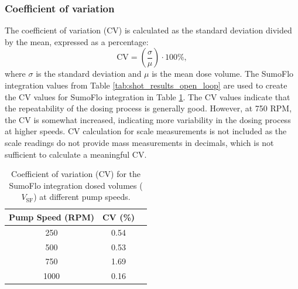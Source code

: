 \documentclass[12pt,a4paper]{article}
\begin{document}
\subsubsection{Coefficient of variation}
The coefficient of variation (CV) is calculated as the standard deviation divided by the mean, expressed as a percentage:
\begin{equation}
    \text{CV} = \left( \frac{\sigma}{\mu} \right) \cdot 100\%,
\end{equation}
where $\sigma$ is the standard deviation and $\mu$ is the mean dose volume. The SumoFlo integration values from Table \ref{tab:shot_results_open_loop} are used to create the CV values for SumoFlo integration in Table \ref{tab:cv_open_loop}. The CV values indicate that the repeatability of the dosing process is generally good. However, at 750 RPM, the CV is somewhat increased, indicating more variability in the dosing process at higher speeds. CV calculation for scale measurements is not included as the scale readings do not provide mass measurements in decimals, which is not sufficient to calculate a meaningful CV.

\begin{table}[h!]
\centering
\begin{tabular}{c cc}
\toprule
\textbf{Pump Speed (RPM)} & \textbf{CV (\%)} \\
\midrule
250 & 0.54 \\
500 & 0.53 \\
750 & 1.69 \\
1000 & 0.16 \\
\bottomrule
\end{tabular}
\caption{Coefficient of variation (CV) for the SumoFlo integration dosed volumes ($V_{\text{SF}}$) at different pump speeds.}
\label{tab:cv_open_loop}
\end{table}

\newpage
\end{document}

